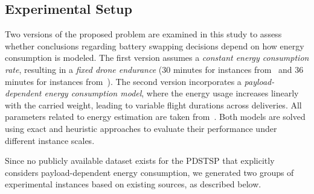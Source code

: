 \documentclass[3p, authoryear, 11pt]{elsarticle}
\begin{document}


\subsection{Experimental Setup}

Two versions of the proposed problem are examined in this study to assess whether conclusions regarding battery swapping decisions depend on how energy consumption is modeled.
The first version assumes a \textit{constant energy consumption rate}, resulting in a \textit{fixed drone endurance} (30 minutes for instances from~\cite{murray_flying_2015} and 36 minutes for instances from~\cite{nguyen_min_cost_2022}).
The second version incorporates a \textit{payload-dependent energy consumption model}, where the energy usage increases linearly with the carried weight, leading to variable flight durations across deliveries.
All parameters related to energy estimation are taken from~\cite{dorling_vehicle_2017}.
Both models are solved using exact and heuristic approaches to evaluate their performance under different instance scales.

Since no publicly available dataset exists for the PDSTSP that explicitly considers payload-dependent energy consumption, we generated two groups of experimental instances based on existing sources, as described below.
\end{document}
